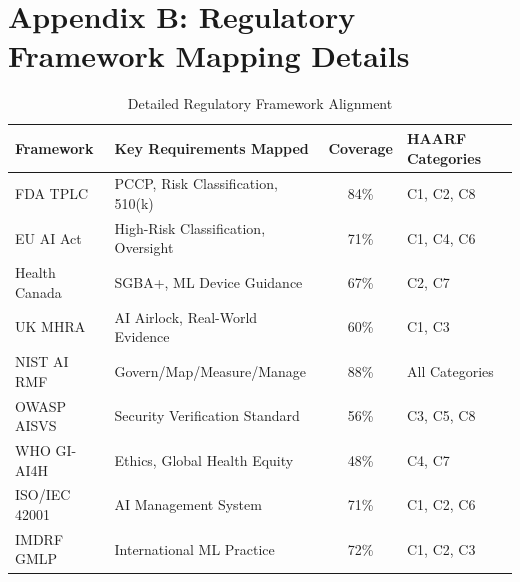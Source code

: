 \documentclass[11pt]{article}
\begin{document}
\section*{Appendix B: Regulatory Framework Mapping Details}

\begin{table}[H]
\centering
\footnotesize
\caption{Detailed Regulatory Framework Alignment}
\begin{tabular}{|l|l|c|l|}
\hline
\textbf{Framework} & \textbf{Key Requirements Mapped} & \textbf{Coverage} & \textbf{HAARF Categories} \\
\hline
FDA TPLC & PCCP, Risk Classification, 510(k) & 84\% & C1, C2, C8 \\
EU AI Act & High-Risk Classification, Oversight & 71\% & C1, C4, C6 \\
Health Canada & SGBA+, ML Device Guidance & 67\% & C2, C7 \\
UK MHRA & AI Airlock, Real-World Evidence & 60\% & C1, C3 \\
NIST AI RMF & Govern/Map/Measure/Manage & 88\% & All Categories \\
OWASP AISVS & Security Verification Standard & 56\% & C3, C5, C8 \\
WHO GI-AI4H & Ethics, Global Health Equity & 48\% & C4, C7 \\
ISO/IEC 42001 & AI Management System & 71\% & C1, C2, C6 \\
IMDRF GMLP & International ML Practice & 72\% & C1, C2, C3 \\
\hline
\end{tabular}
\end{table}
\end{document}
